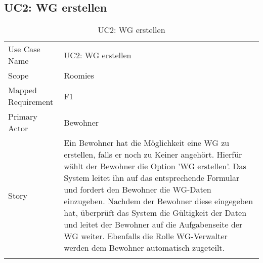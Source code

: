 \subsection{UC2: WG erstellen}
\begin{table}[H]
	\tablestyle
	\tablealtcolored
	\begin{tabularx}{\textwidth}{lX}
		\tablebody
			Use Case Name &
			UC2: WG erstellen
			\tabularnewline
			Scope &
			Roomies
			\tabularnewline
			Mapped Requirement &
			F1
			\tabularnewline
			Primary Actor &
			Bewohner
			\tabularnewline
			Story &
			Ein Bewohner hat die Möglichkeit eine WG zu erstellen, falls er noch zu Keiner angehört. Hierfür wählt der Bewohner die Option 'WG erstellen'. Das System leitet ihn auf das entsprechende Formular und fordert den Bewohner die WG-Daten einzugeben. Nachdem der Bewohner diese eingegeben hat, überprüft das System die Gültigkeit der Daten und leitet der Bewohner auf die Aufgabenseite der WG weiter. Ebenfalls die Rolle WG-Verwalter werden dem Bewohner automatisch zugeteilt.
			\tabularnewline
		\tableend
	\end{tabularx}
	\caption{UC2: WG erstellen}
\end{table}


